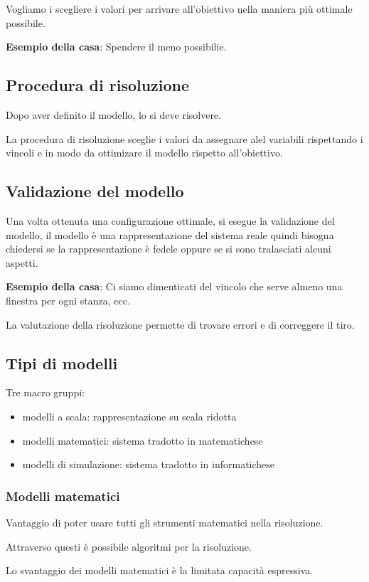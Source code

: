 Vogliamo i scegliere i valori per arrivare all'obiettivo nella maniera più ottimale possibile.

\textbf{Esempio della casa}:
Spendere il meno possibilie.

\subsection{Procedura di risoluzione}
Dopo aver definito il modello, lo si deve risolvere.

La procedura di risoluzione sceglie i valori da assegnare alel variabili rispettando i vincoli e in modo da 
ottimizare il modello rispetto all'obiettivo.

\subsection{Validazione del modello}
Una volta ottenuta una configurazione ottimale, si esegue la validazione del modello,
il modello è una rappresentazione del sistema reale quindi bisogna chiedersi se la rappresentazione è fedele
oppure se si sono tralasciati alcuni aspetti.

\textbf{Esempio della casa}:
Ci siamo dimenticati del vincolo che serve almeno una finestra per ogni stanza, ecc.

La valutazione della risoluzione permette di trovare errori e di correggere il tiro.

\subsection{Tipi di modelli}
Tre macro gruppi:
\begin{itemize}
    \item modelli a scala: rappresentazione su scala ridotta
    \item modelli matematici: sistema tradotto in matematichese
    \item modelli di simulazione: sistema tradotto in informatichese
\end{itemize}

\subsubsection{Modelli matematici}
Vantaggio di poter usare tutti gli strumenti matematici nella risoluzione.

Attraverso questi è possibile algoritmi per la risoluzione.

Lo svantaggio dei modelli matematici è la limitata capacità espressiva.

